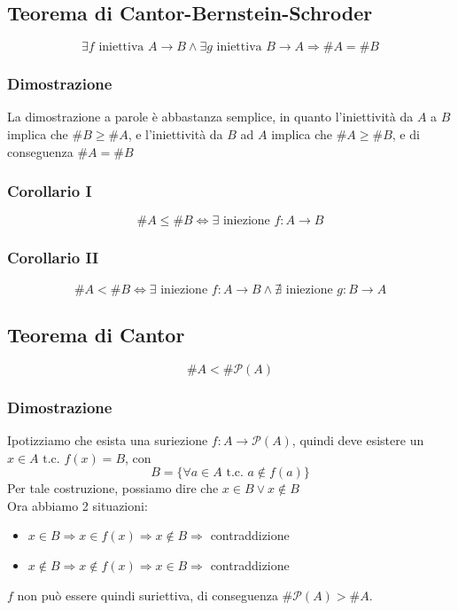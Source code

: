 \documentclass{report}
\begin{document}
    \subsection{Teorema di Cantor-Bernstein-Schroder}
        $$\exists f \textrm{ iniettiva } A \longrightarrow B \land \exists g 
        \textrm{ iniettiva } B \longrightarrow A \Longrightarrow \#A = \#B$$
        \subsubsection{Dimostrazione}
            La dimostrazione a parole è abbastanza semplice, in quanto l'iniettività
            da $A$ a $B$ implica che $\#B \geq \#A$, e l'iniettività da $B$ ad $A$ implica
            che $\#A \geq \#B$, e di conseguenza $\#A = \#B$
        \subsubsection{Corollario I}
            $$\#A \leq \#B \Longleftrightarrow \exists \textrm{ iniezione } f: A \longrightarrow B$$
        \subsubsection{Corollario II}
            $$\#A < \#B \Longleftrightarrow \exists \textrm{ iniezione } f: A \longrightarrow B \wedge \nexists 
                \textrm{ iniezione } g: B \longrightarrow A$$
    \subsection{Teorema di Cantor}
        $$\# A < \#\mathcal{P}\left(A\right)$$
        \subsubsection{Dimostrazione}
            Ipotizziamo che esista una suriezione $f: A \rightarrow \mathcal{P}\left(A\right)$, 
            quindi deve esistere un $x \in A \textrm{ t.c. } f\left(x\right) = B$, con 
            $$B = \{\forall a \in A \textrm{ t.c. } a \notin f\left(a\right)\}$$
            Per tale costruzione, possiamo dire che $x \in B \vee x \notin B$ \\
            Ora abbiamo 2 situazioni:
            \begin{itemize}
                \item $x \in B \Longrightarrow x \in f\left(x\right) \Longrightarrow x \notin B \Longrightarrow$ contraddizione
                \item $x \notin B \Longrightarrow x \notin f\left(x\right) \Longrightarrow x \in B \Longrightarrow$ contraddizione
            \end{itemize}
            $f$ non può essere quindi suriettiva, di conseguenza $\#\mathcal{P}\left(A\right) > \#A$.
\end{document}
